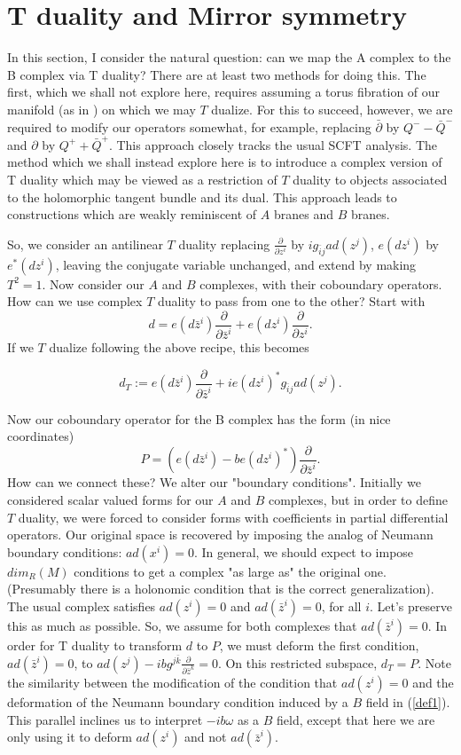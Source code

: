 \documentclass[a4paper,11pt]{amsart}
\newcommand{\db}{\bar{\partial}}
\begin{document}
\section{T duality and Mirror symmetry}\label{TDM}

In this section, I consider the natural question: can we map the A complex to 
the B complex via T duality? 
 There are at least two methods for doing this. The first, which we shall not
 explore here, requires assuming a torus fibration of our manifold (as in
  \cite{SYZ}) on which we may $T$ dualize. For this to succeed, however, we are 
  required to modify our operators somewhat, for example, replacing $\db$ by
   $Q^{-} - \bar Q^{-}$ 
  and $\partial$ by $Q^{+} + \bar Q^{+}$.
  This approach closely tracks the usual SCFT analysis.
The method which we shall instead explore here is to introduce a complex 
version of
 T duality which may be viewed as a restriction of $T$ duality to objects
 associated to the holomorphic tangent bundle and its dual. This approach leads
 to constructions which are weakly reminiscent of $A$ branes and $B$
  branes. 

So, we consider an antilinear $T$ duality replacing 
$\frac{\partial}{\partial z^i}$ by 
$ig_{\bar i j}ad(z^j)$, $e(dz^i)$ by $e^*(dz^i)$, leaving the conjugate variable
 unchanged, 
 and extend by making $T^2 = 1$. Now consider our $A$ and $B$ complexes, with
  their coboundary operators.  
How can we use complex $T$ duality to pass from one to the other? 
Start with 
$$d = 
e(d\bar z^i)\frac{\partial}{\partial \bar z^i}
 + e(dz^i)\frac{\partial}{\partial z^i}.$$
If we $T$ dualize following the above recipe, this becomes 

$$d_T:=e(d\bar z^i)\frac{\partial}{\partial \bar z^i} + ie(dz^i)^*g_{\bar i j}ad(z^j).$$

Now our coboundary operator for the B complex has the form
 (in nice coordinates)
$$P = (e(d\bar z^i)-be(dz^i)^*)\frac{\partial}{\partial \bar z^i}.$$
How can we connect these? We alter our "boundary conditions". Initially
we considered scalar valued forms for our $A$ and $B$ complexes, but in order to
define $T$ duality, we were forced to consider forms with
coefficients in partial differential operators. Our original space is recovered 
by imposing the analog of Neumann boundary conditions: $ad(x^i) = 0$. 
In general, we should expect to impose $dim_R(M)$ conditions to get a complex
"as large as" the original one. (Presumably there is a holonomic condition that
is the correct generalization). The usual complex satisfies 
$ad(z^i) = 0$ and $ad(\bar z^i) = 0$, for all $i$. Let's preserve this as much
 as possible. 
So, we assume for both complexes that $ad(\bar z^i) = 0$. In order for T duality
to transform $d$ to $P$, we must deform the first condition, $ad(\bar z^i) = 0$,
 to 
$ad(z^j) - ibg^{j\bar k}\frac{\partial}{\partial \bar z^k} = 0$. 
On this restricted subspace, $d_T = P$. Note the
similarity between the modification of the condition that $ad(z^i) = 0$ 
and the deformation of the Neumann boundary
condition induced by a $B$ field in (\ref{def1}). This parallel inclines us to
interpret $-ib\omega$ as a $B$ field, except that here we are only using it to
deform $ad(z^i)$ and not $ad(\bar z^i)$.
 
\end{document}
